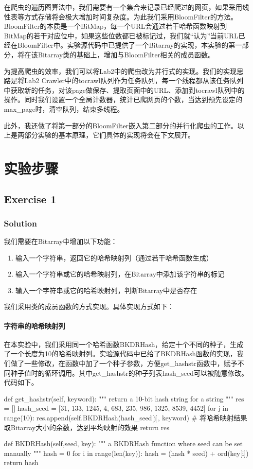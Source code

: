 \documentclass{article}
\begin{document}
在爬虫的遍历图算法中，我们需要有一个集合来记录已经爬过的网页，如果采用线性表等方式存储将会极大增加时间复杂度。为此我们采用BloomFilter的方法。BloomFilter的本质是一个BitMap，每一个URL会通过若干哈希函数映射到BitMap的若干对应位中，如果这些位数都已被标记过，我们就“认为”当前URL已经在BloomFilter中。实验源代码中已提供了一个Bitarray的实现，本实验的第一部分，将在该Bitarray类的基础上，增加与BloomFilter相关的成员函数。

为提高爬虫的效率，我们可以将Lab2中的爬虫改为并行式的实现。我们的实现思路是将Lab2 Crawler中的tocrawl队列作为任务队列，每一个线程都从该任务队列中获取新的任务，对该page做保存、提取页面中的URL、添加到tocrawl队列中的操作。同时我们设置一个全局计数器，统计已爬网页的个数，当达到预先设定的max\_page时，清空队列，结束多线程。

此外，我还做了将第一部分的BloomFilter嵌入第二部分的并行化爬虫的工作。以上是两部分实验的基本原理，它们具体的实现将会在下文展开。

\section{实验步骤}
\subsection{Exercise 1}


\subsubsection{Solution}
我们需要在Bitarray中增加以下功能：
\begin{enumerate}
\item 输入一个字符串，返回它的哈希映射列（通过若干哈希函数生成）
\item 输入一个字符串或它的哈希映射列，在Bitarray中添加该字符串的标记
\item 输入一个字符串或它的哈希映射列，判断Bitarray中是否存在
\end{enumerate}

我们采用类的成员函数的方式实现。具体实现方式如下：

\paragraph{字符串的哈希映射列}
在本实验中，我们采用同一个哈希函数BKDRHash，给定十个不同的种子，生成了一个长度为10的哈希映射列。实验源代码中已给了BKDRHash函数的实现，我们做了一些修改，在函数中加了一个种子参数，方便get\_hashstr函数中，赋予不同种子值时的循环调用。其中get\_hashstr的种子列表hash\_seed可以被随意修改。代码如下。
\begin{python}
def get_hashstr(self, keyword):
    """ return a 10-bit hash string for a string """
    res = []
    hash_seed = [31, 133, 1245, 4, 683, 235, 986, 1325, 8539, 4452]
    for j in range(10):
        res.append(self.BKDRHash(hash_seed[j], keyword) %
                   # 将哈希映射结果取Bitarray大小的余数，达到平均映射的效果
    return res

def BKDRHash(self,seed, key):
    """ a BKDRHash function where seed can be set manually """
    hash = 0
    for i in range(len(key)):
        hash = (hash * seed) + ord(key[i])
    return hash
\end{python}
\end{document}
